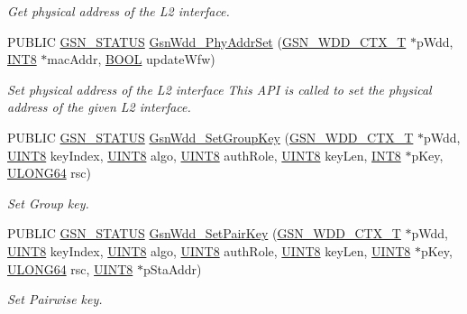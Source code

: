 \begin{DoxyCompactItemize}
\begin{DoxyCompactList}\small\item\em Get physical address of the L2 interface. \end{DoxyCompactList}\item 
PUBLIC \hyperlink{a00660_gada5951904ac6110b1fa95e51a9ddc217}{GSN\_\-STATUS} \hyperlink{a00677_gaab46be560feac69bcc716ba326b80074}{GsnWdd\_\-PhyAddrSet} (\hyperlink{a00108}{GSN\_\-WDD\_\-CTX\_\-T} $\ast$pWdd, \hyperlink{a00660_ga307b8734c020247f6bac4fcde0dcfbb9}{INT8} $\ast$macAddr, \hyperlink{a00660_ga1f04022c0a182c51c059438790ea138c}{BOOL} updateWfw)
\begin{DoxyCompactList}\small\item\em Set physical address of the L2 interface This API is called to set the physical address of the given L2 interface. \end{DoxyCompactList}\item 
PUBLIC \hyperlink{a00660_gada5951904ac6110b1fa95e51a9ddc217}{GSN\_\-STATUS} \hyperlink{a00677_gabc21d01bd143e531d2a989e46d60ab78}{GsnWdd\_\-SetGroupKey} (\hyperlink{a00108}{GSN\_\-WDD\_\-CTX\_\-T} $\ast$pWdd, \hyperlink{a00660_gab27e9918b538ce9d8ca692479b375b6a}{UINT8} keyIndex, \hyperlink{a00660_gab27e9918b538ce9d8ca692479b375b6a}{UINT8} algo, \hyperlink{a00660_gab27e9918b538ce9d8ca692479b375b6a}{UINT8} authRole, \hyperlink{a00660_gab27e9918b538ce9d8ca692479b375b6a}{UINT8} keyLen, \hyperlink{a00660_ga307b8734c020247f6bac4fcde0dcfbb9}{INT8} $\ast$pKey, \hyperlink{a00660_ga28961430434ccabca6862ea93fe9a15b}{ULONG64} rsc)
\begin{DoxyCompactList}\small\item\em Set Group key. \end{DoxyCompactList}\item 
PUBLIC \hyperlink{a00660_gada5951904ac6110b1fa95e51a9ddc217}{GSN\_\-STATUS} \hyperlink{a00677_gaf4ae3797779c34f09ecedbb97e1119ec}{GsnWdd\_\-SetPairKey} (\hyperlink{a00108}{GSN\_\-WDD\_\-CTX\_\-T} $\ast$pWdd, \hyperlink{a00660_gab27e9918b538ce9d8ca692479b375b6a}{UINT8} keyIndex, \hyperlink{a00660_gab27e9918b538ce9d8ca692479b375b6a}{UINT8} algo, \hyperlink{a00660_gab27e9918b538ce9d8ca692479b375b6a}{UINT8} authRole, \hyperlink{a00660_gab27e9918b538ce9d8ca692479b375b6a}{UINT8} keyLen, \hyperlink{a00660_gab27e9918b538ce9d8ca692479b375b6a}{UINT8} $\ast$pKey, \hyperlink{a00660_ga28961430434ccabca6862ea93fe9a15b}{ULONG64} rsc, \hyperlink{a00660_gab27e9918b538ce9d8ca692479b375b6a}{UINT8} $\ast$pStaAddr)
\begin{DoxyCompactList}\small\item\em Set Pairwise key. \end{DoxyCompactList}\end{DoxyCompactItemize}
